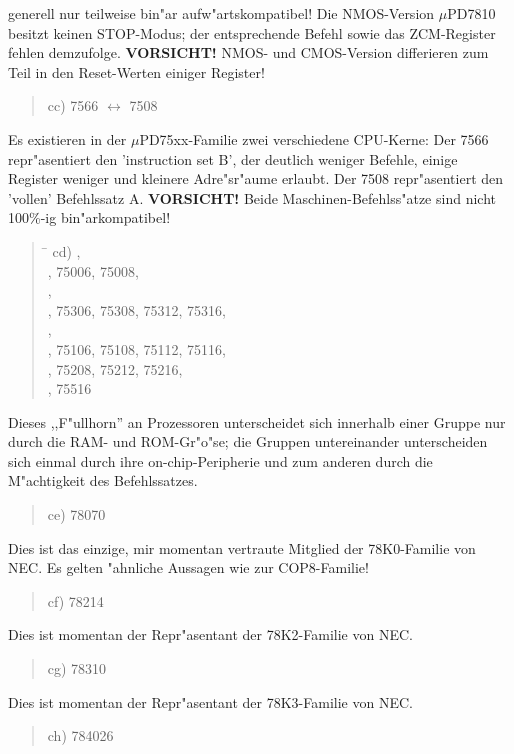 \documentclass[12pt,a4paper,twoside]{report}
\newcommand{\bb}[1]{{\bf #1}}
\begin{document}
generell nur teilweise bin"ar aufw"artskompatibel!  Die NMOS-Version
$\mu$PD7810 besitzt keinen STOP-Modus; der entsprechende Befehl sowie das
ZCM-Register fehlen demzufolge.  \bb{VORSICHT!} NMOS- und CMOS-Version
differieren zum Teil in den Reset-Werten einiger Register!
\begin{quote}
cc) 7566 $\leftrightarrow$ 7508
\end{quote}
Es existieren in der $\mu$PD75xx-Familie zwei verschiedene
CPU-Kerne: Der 7566 repr"asentiert den 'instruction set B', der
deutlich weniger Befehle, einige Register weniger und kleinere
Adre"sr"aume erlaubt.  Der 7508 repr"asentiert den 'vollen'
Befehlssatz A.  {\bf VORSICHT!} Beide Maschinen-Befehlss"atze
sind nicht 100\%-ig bin"arkompatibel!
\begin{quote}
\begin{tabbing}
\hspace{0.7cm} \= \kill
cd) , \\
    , 75006, 75008, \\
    , \\
    , 75306, 75308, 75312, 75316, \\
    , \\
    , 75106, 75108, 75112, 75116, \\
    , 75208, 75212, 75216, \\
    , 75516 \\
\end{tabbing}
\end{quote}
Dieses ,,F"ullhorn'' an Prozessoren unterscheidet sich innerhalb einer
Gruppe nur durch die RAM- und ROM-Gr"o"se; die Gruppen untereinander
unterscheiden sich einmal durch ihre on-chip-Peripherie und
zum anderen durch die M"achtigkeit des Befehlssatzes.
\begin{quote}
ce) 78070
\end{quote}
Dies ist das einzige, mir momentan vertraute Mitglied der
78K0-Familie von NEC.  Es gelten "ahnliche Aussagen wie zur
COP8-Familie!
\begin{quote}
cf) 78214
\end{quote}
Dies ist momentan der Repr"asentant der 78K2-Familie von NEC.
\begin{quote}
cg) 78310
\end{quote}
Dies ist momentan der Repr"asentant der 78K3-Familie von NEC.
\begin{quote}
ch) 784026
\end{quote}
\end{document}
